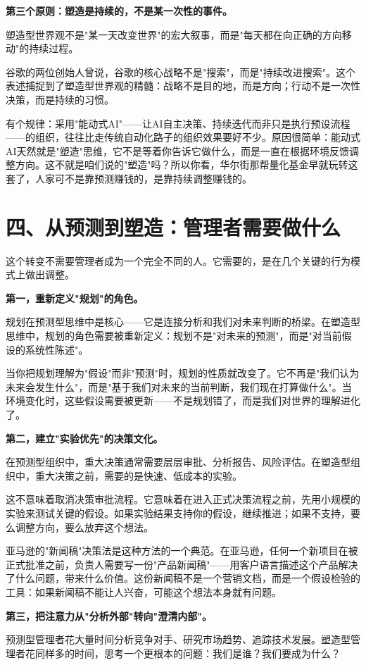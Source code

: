\textbf{第三个原则：塑造是持续的，不是某一次性的事件。}

塑造型世界观不是"某一天改变世界"的宏大叙事，而是"每天都在向正确的方向移动"的持续过程。

谷歌的两位创始人曾说，谷歌的核心战略不是"搜索"，而是"持续改进搜索"。这个表述捕捉到了塑造型世界观的精髓：战略不是目的地，而是方向；行动不是一次性决策，而是持续的习惯。

有个规律：采用"能动式AI"——让AI自主决策、持续迭代而非只是执行预设流程——的组织，往往比走传统自动化路子的组织效果要好不少。原因很简单：能动式AI天然就是"塑造"思维，它不是等着你告诉它做什么，而是一直在根据环境反馈调整方向。这不就是咱们说的"塑造"吗？所以你看，华尔街那帮量化基金早就玩转这套了，人家可不是靠预测赚钱的，是靠持续调整赚钱的。


\section{四、从预测到塑造：管理者需要做什么}


这个转变不需要管理者成为一个完全不同的人。它需要的，是在几个关键的行为模式上做出调整。

\textbf{第一，重新定义"规划"的角色。}

规划在预测型思维中是核心——它是连接分析和我们对未来判断的桥梁。在塑造型思维中，规划的角色需要被重新定义：规划不是"对未来的预测"，而是"对当前假设的系统性陈述"。

当你把规划理解为"假设"而非"预测"时，规划的性质就改变了。它不再是"我们认为未来会发生什么"，而是"基于我们对未来的当前判断，我们现在打算做什么"。当环境变化时，这些假设需要被更新——不是规划错了，而是我们对世界的理解进化了。

\textbf{第二，建立"实验优先"的决策文化。}

在预测型组织中，重大决策通常需要层层审批、分析报告、风险评估。在塑造型组织中，重大决策之前，需要的是快速、低成本的实验。

这不意味着取消决策审批流程。它意味着在进入正式决策流程之前，先用小规模的实验来测试关键的假设。如果实验结果支持你的假设，继续推进；如果不支持，要么调整方向，要么放弃这个想法。

亚马逊的"新闻稿"决策法是这种方法的一个典范。在亚马逊，任何一个新项目在被正式批准之前，负责人需要写一份"产品新闻稿"——用客户语言描述这个产品解决了什么问题，带来什么价值。这份新闻稿不是一个营销文档，而是一个假设检验的工具：如果新闻稿不能让人兴奋，可能这个想法本身就有问题。

\textbf{第三，把注意力从"分析外部"转向"澄清内部"。}

预测型管理者花大量时间分析竞争对手、研究市场趋势、追踪技术发展。塑造型管理者花同样多的时间，思考一个更根本的问题：我们是谁？我们要成为什么？

